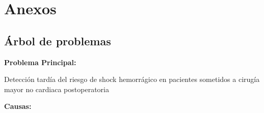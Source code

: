 \documentclass[12pt, letterpaper]{article}
\begin{document}
\section*{Anexos}

\subsection*{Árbol de problemas}

\textbf{Problema Principal:}

\vspace{0.3cm}
Detección tardía del riesgo de shock hemorrágico en pacientes sometidos a cirugía mayor no cardiaca postoperatoria

\vspace{0.5cm}
\textbf{Causas:}
\end{document}
